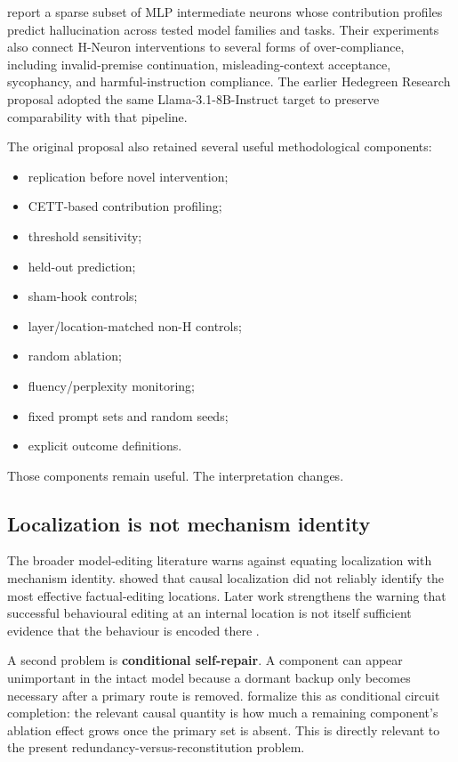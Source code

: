 \textcite{gao2025hneuron} report a sparse subset of MLP intermediate neurons whose contribution profiles predict hallucination across tested model families and tasks. Their experiments also connect H-Neuron interventions to several forms of over-compliance, including invalid-premise continuation, misleading-context acceptance, sycophancy, and harmful-instruction compliance. The earlier Hedegreen Research proposal adopted the same Llama-3.1-8B-Instruct target to preserve comparability with that pipeline.

The original proposal also retained several useful methodological components:

\begin{itemize}
\tightlist
\item
  replication before novel intervention;
\item
  CETT-based contribution profiling;
\item
  threshold sensitivity;
\item
  held-out prediction;
\item
  sham-hook controls;
\item
  layer/location-matched non-H controls;
\item
  random ablation;
\item
  fluency/perplexity monitoring;
\item
  fixed prompt sets and random seeds;
\item
  explicit outcome definitions.
\end{itemize}

Those components remain useful. The interpretation changes.

\subsection{Localization is not mechanism identity}\label{localization-is-not-mechanism-identity}

The broader model-editing literature warns against equating localization with mechanism identity. \textcite{hase2023localization} showed that causal localization did not reliably identify the most effective factual-editing locations. Later work strengthens the warning that successful behavioural editing at an internal location is not itself sufficient evidence that the behaviour is encoded there \autocite{wang2025editing}.

A second problem is \textbf{conditional self-repair}. A component can appear unimportant in the intact model because a dormant backup only becomes necessary after a primary route is removed. \textcite{gong2026coax} formalize this as conditional circuit completion: the relevant causal quantity is how much a remaining component's ablation effect grows once the primary set is absent. This is directly relevant to the present redundancy-versus-reconstitution problem.

